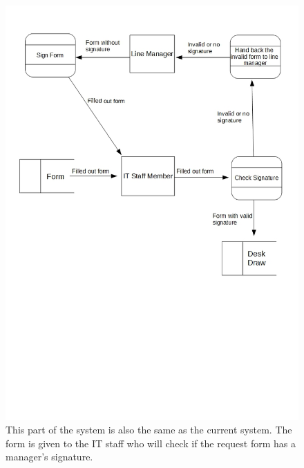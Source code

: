 \begin{figure}[H]
\includegraphics[width=\textwidth]{dataflowdiagram2.jpg}
\caption{This part of the system is also the same as the current system. The form is given to the IT staff who will check if the request form has a manager's signature. } \label{Page1Interview}
\end{figure}

